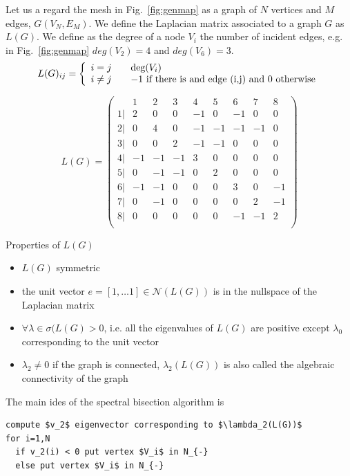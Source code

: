 Let us a regard the mesh in Fig.~\ref{fig:genmap} as a graph of $N$ vertices and $M$ edges, $G(V_N,E_M)$. We define the Laplacian matrix associated to a graph $G$ as $L(G)$. We define as the degree of a node $V_i$ the number of incident edges, e.g. in Fig.~\ref{fig:genmap} $deg(V_2)=4$ and $deg(V_6)=3$.
\begin{equation}
L(G)_{ij}= \left\{
  \begin{array}{l l}
    i=j & \quad \text{deg($V_i$)}\\
    i\neq j & \quad -1 \text{ if there is and edge (i,j) and } 0 \text{ otherwise}
  \end{array} \right .
\end{equation}

\begin{equation}
L(G)= \begin{pmatrix} 
  &1 & 2 & 3 & 4 & 5 & 6 & 7 & 8\\ 
  \hline
1| &2 & 0 & 0 & -1 & 0 & -1 & 0 & 0\\ 
2| &0 & 4 & 0 & -1 & -1 & -1 & -1 & 0\\  
3| &0 & 0 & 2 & -1 & -1 & 0 & 0 & 0\\ 
4| &-1 & -1 & -1 & 3 & 0 & 0 & 0 & 0\\ 
5| &0 & -1 & -1 & 0 & 2 & 0 & 0 & 0\\ 
6| &-1 & -1 & 0 & 0 & 0 & 3 & 0 & -1\\ 
7| &0 & -1 & 0 & 0 & 0 & 0 & 2 & -1\\ 
8| &0 & 0 & 0 & 0 & 0 & -1 & -1 & 2\\  
\end{pmatrix}
\end{equation}

Properties of $L(G)$
\begin{itemize}
\item $L(G)$ symmetric
\item the unit vector $e=[1, \ldots 1]\in \mathcal{N}(L(G))$ is in the nullspace of the Laplacian matrix
\item $\forall\lambda \in \sigma(L(G)>0$, i.e. all the eigenvalues of $L(G)$ are positive except $\lambda_0$ corresponding to the unit vector
\item $\lambda_2\neq 0$ if the graph is connected, $\lambda_2(L(G))$ is also called the algebraic connectivity of the graph
\end{itemize}

The main ides of the spectral bisection algorithm is
\begin{verbatim}
compute $v_2$ eigenvector corresponding to $\lambda_2(L(G))$
for i=1,N
  if v_2(i) < 0 put vertex $V_i$ in N_{-} 
  else put vertex $V_i$ in N_{-} 
\end{verbatim}

